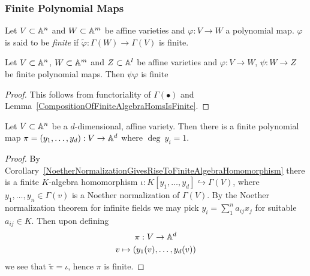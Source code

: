     \subsubsection{Finite Polynomial Maps}
        \begin{definition}
            Let $V\subset \mathbb{A}^n$ and $W\subset \mathbb{A}^m$ be affine varieties and $\varphi : V\rightarrow W$ a polynomial map. $\varphi$ is said to be \textit{finite} if $\widetilde{\varphi} :\Gamma(W)\rightarrow \Gamma(V)$ is finite. 
        \end{definition}
        \begin{lemma}\label{CompositionOfFinitePolynomialMapsIsFinite}
            Let $V\subset \mathbb{A}^n$, $W\subset \mathbb{A}^m$ and $Z\subset \mathbb{A}^l$ be affine varieties and $\varphi : V \rightarrow W$, $\psi : W\rightarrow Z$ be finite polynomial maps. Then $\psi\varphi$ is finite
        \end{lemma}
        \begin{proof}
            This follows from functoriality of $\Gamma(\bullet)$ and Lemma~\ref{CompositionOfFiniteAlgebraHomsIsFinite}.
        \end{proof}
        \begin{lemma}\label{FiniteLinearProjection}
            Let $V\subset \mathbb{A}^n$ be a $d$-dimensional, affine variety. Then there is a finite polynomial map $\pi=(y_1,\dots,y_d) : V\rightarrow \mathbb{A}^d$ where $\deg \ y_i = 1$.
        \end{lemma}
        \begin{proof}
            By Corollary~\ref{NoetherNormalizationGivesRiseToFiniteAlgebraHomomorphism} there is a finite $K$-algebra homomorphism $\iota : K[y_1,\dots,y_d]\hookrightarrow \Gamma(V)$, where $y_1, \dots, y_n\in \Gamma(v)$ is a Noether normalization of $\Gamma(V)$. By the Noether normalization theorem for infinite fields we may pick $y_i = \sum_1^n a_{ij}x_j$ for suitable $a_{ij}\in K$. Then upon defining
            \begin{gather*} 
                \pi : V \rightarrow \mathbb{A}^d\\
                v\mapsto (y_1(v),\dots,y_d(v))
            \end{gather*}
            we see that $\widetilde{\pi}=\iota$, hence $\pi$ is finite. 
        \end{proof}
